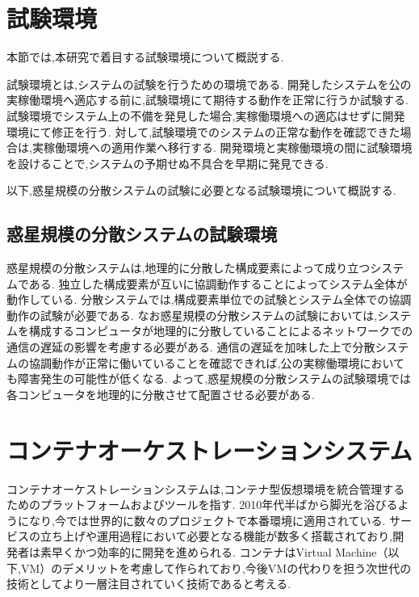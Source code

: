 \section{試験環境}
\label{bg:staging}

本節では,本研究で着目する試験環境について概説する.

試験環境とは,システムの試験を行うための環境である.
開発したシステムを公の実稼働環境へ適応する前に,試験環境にて期待する動作を正常に行うか試験する.
試験環境でシステム上の不備を発見した場合,実稼働環境への適応はせずに開発環境にて修正を行う.
対して,試験環境でのシステムの正常な動作を確認できた場合は,実稼働環境への適用作業へ移行する.
開発環境と実稼働環境の間に試験環境を設けることで,システムの予期せぬ不具合を早期に発見できる.

以下,惑星規模の分散システムの試験に必要となる試験環境について概説する.

\subsection{惑星規模の分散システムの試験環境}
\label{bg:staging:planetary-scale-distributed-system}

惑星規模の分散システムは,地理的に分散した構成要素によって成り立つシステムである.
独立した構成要素が互いに協調動作することによってシステム全体が動作している.
分散システムでは,構成要素単位での試験とシステム全体での協調動作の試験が必要である.
なお惑星規模の分散システムの試験においては,システムを構成するコンピュータが地理的に分散していることによるネットワークでの通信の遅延の影響を考慮する必要がある.
通信の遅延を加味した上で分散システムの協調動作が正常に働いていることを確認できれば,公の実稼働環境においても障害発生の可能性が低くなる.
よって,惑星規模の分散システムの試験環境では各コンピュータを地理的に分散させて配置させる必要がある.

\section{コンテナオーケストレーションシステム}
\label{background:container-orchestration-system}

コンテナオーケストレーションシステムは,コンテナ型仮想環境を統合管理するためのプラットフォームおよびツールを指す.
2010年代半ばから脚光を浴びるようになり,今では世界的に数々のプロジェクトで本番環境に適用されている.
サービスの立ち上げや運用過程において必要となる機能が数多く搭載されており,開発者は素早くかつ効率的に開発を進められる.
コンテナはVirtual Machine（以下,VM）のデメリットを考慮して作られており,今後VMの代わりを担う次世代の技術としてより一層注目されていく技術であると考える.


